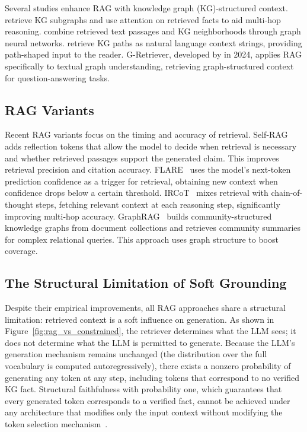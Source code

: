 Several studies enhance RAG with knowledge graph (KG)-structured context. \citet{he2021multihop} retrieve KG subgraphs and use attention on retrieved facts to aid multi-hop reasoning. \citet{yasunaga2021qagnn} combine retrieved text passages and KG neighborhoods through graph neural networks. \citet{shi2021kgpath} retrieve KG paths as natural language context strings, providing path-shaped input to the reader. G-Retriever, developed by \citet{he2024gretriever} in 2024, applies RAG specifically to textual graph understanding, retrieving graph-structured context for question-answering tasks.

\subsection{RAG Variants}

Recent RAG variants focus on the timing and accuracy of retrieval. Self-RAG~\citep{asai2024selfrag} adds reflection tokens that allow the model to decide when retrieval is necessary and whether retrieved passages support the generated claim. This improves retrieval precision and citation accuracy. FLARE~\citep{jiang2023flare} uses the model's next-token prediction confidence as a trigger for retrieval, obtaining new context when confidence drops below a certain threshold. IRCoT~\citep{trivedi2022ircot} mixes retrieval with chain-of-thought steps, fetching relevant context at each reasoning step, significantly improving multi-hop accuracy. GraphRAG~\citep{edge2024graphrag} builds community-structured knowledge graphs from document collections and retrieves community summaries for complex relational queries. This approach uses graph structure to boost coverage.

\subsection{The Structural Limitation of Soft Grounding}

Despite their empirical improvements, all RAG approaches share a structural limitation: retrieved context is a soft influence on generation. As shown in Figure~\ref{fig:rag_vs_constrained}, the retriever determines what the LLM sees; it does not determine what the LLM is permitted to generate. Because the LLM's generation mechanism remains unchanged (the distribution over the full vocabulary is computed autoregressively), there exists a nonzero probability of generating any token at any step, including tokens that correspond to no verified KG fact. Structural faithfulness with probability one, which guarantees that every generated token corresponds to a verified fact, cannot be achieved under any architecture that modifies only the input context without modifying the token selection mechanism~\citep{luo2025-graph-constrained-reasoning, geng2023grammarconstrained}.

